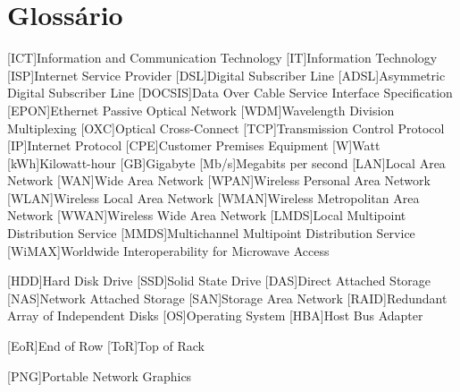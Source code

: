 \chapter{Glossário}

\footnotesize
\SingleSpacing

\begin{multicols}{2}
\begin{acronym}[AAAAAA]

	[ICT]{Information and Communication Technology}
	[IT]{Information Technology}
	[ISP]{Internet Service Provider}
	[DSL]{Digital Subscriber Line}
	[ADSL]{Asymmetric Digital Subscriber Line}
	[DOCSIS]{Data Over Cable Service Interface Specification}
	[EPON]{Ethernet Passive Optical Network}
	[WDM]{Wavelength Division Multiplexing}
	[OXC]{Optical Cross-Connect}
	[TCP]{Transmission Control Protocol}
	[IP]{Internet Protocol}
	[CPE]{Customer Premises Equipment}
	{Watt}
	[kWh]{Kilowatt-hour}
	[GB]{Gigabyte}
	[Mb/s]{Megabits per second}
	[LAN]{Local Area Network}
	[WAN]{Wide Area Network}
	[WPAN]{Wireless Personal Area Network}
	[WLAN]{Wireless Local Area Network}
	[WMAN]{Wireless Metropolitan Area Network}
	[WWAN]{Wireless Wide Area Network}
	[LMDS]{Local Multipoint Distribution Service}
	[MMDS]{Multichannel Multipoint Distribution Service}
	[WiMAX]{Worldwide Interoperability for Microwave Access}

	[HDD]{Hard Disk Drive}
	[SSD]{Solid State Drive}
	[DAS]{Direct Attached Storage}
	[NAS]{Network Attached Storage}
	[SAN]{Storage Area Network}
	[RAID]{Redundant Array of Independent Disks}
	[OS]{Operating System}
	[HBA]{Host Bus Adapter}

	[EoR]{End of Row}
	[ToR]{Top of Rack}

	[PNG]{Portable Network Graphics}


\end{acronym}
\end{multicols}

